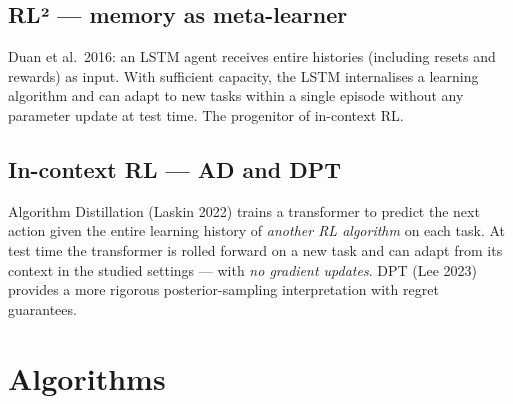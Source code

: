 \documentclass[11pt,oneside]{scrbook}
\begin{document}
\section{RL² --- memory as meta-learner}

Duan et al.\ 2016: an LSTM agent receives entire histories (including resets and rewards) as input. With sufficient capacity, the LSTM internalises a learning algorithm and can adapt to new tasks within a single episode without any parameter update at test time. The progenitor of in-context RL.

\section{In-context RL --- AD and DPT}

Algorithm Distillation (Laskin 2022) trains a transformer to predict the next action given the entire learning history of \emph{another RL algorithm} on each task. At test time the transformer is rolled forward on a new task and can adapt from its context in the studied settings --- with \emph{no gradient updates}. DPT (Lee 2023) provides a more rigorous posterior-sampling interpretation with regret guarantees.

\chapter{Algorithms}

\begin{algorithm}[H]
\caption{RND-augmented Q-learning ($\hat\sigma$: running intrinsic-reward standard deviation)}
\end{algorithm}

\begin{algorithm}[H]
\caption{MAML (single task per outer step shown for clarity)}
\end{algorithm}
\end{document}
